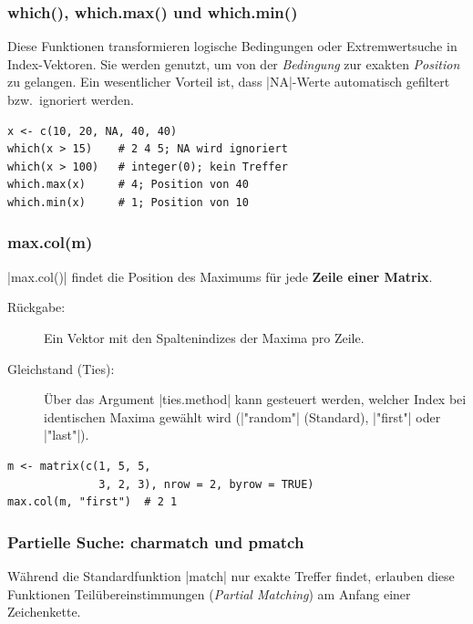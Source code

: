 \documentclass[10pt,twocolumn]{scrartcl}
\renewcommand{\lstinline}{\mycoloredinline}
\begin{document}
\subsubsection{which(), which.max() und which.min()}

Diese Funktionen transformieren logische Bedingungen oder Extremwertsuche in Index-Vektoren. Sie werden genutzt, um von der \emph{Bedingung} zur exakten \emph{Position} zu gelangen. Ein wesentlicher Vorteil ist, dass \lstinline|NA|-Werte automatisch gefiltert bzw.\ ignoriert werden.

\begin{lstlisting}
x <- c(10, 20, NA, 40, 40)
which(x > 15)    # 2 4 5; NA wird ignoriert
which(x > 100)   # integer(0); kein Treffer
which.max(x)     # 4; Position von 40
which.min(x)     # 1; Position von 10
\end{lstlisting}


\subsubsection{max.col(m)}

\lstinline|max.col()| findet die Position des Maximums für jede \textbf{Zeile einer Matrix}.

\begin{description}
\item[Rückgabe:] Ein Vektor mit den Spaltenindizes der Maxima pro Zeile.
\item[Gleichstand (Ties):] Über das Argument \lstinline|ties.method| kann gesteuert werden, welcher Index bei identischen Maxima gewählt wird (\lstinline|"random"| (Standard), \lstinline|"first"| oder \lstinline|"last"|).
\end{description}

\begin{lstlisting}
m <- matrix(c(1, 5, 5,
              3, 2, 3), nrow = 2, byrow = TRUE)
max.col(m, "first")  # 2 1
\end{lstlisting}


\subsubsection{Partielle Suche: charmatch und pmatch}

Während die Standardfunktion \lstinline|match| nur exakte Treffer findet, erlauben diese Funktionen Teilübereinstimmungen (\emph{Partial Matching}) am Anfang einer Zeichenkette.
\end{document}
